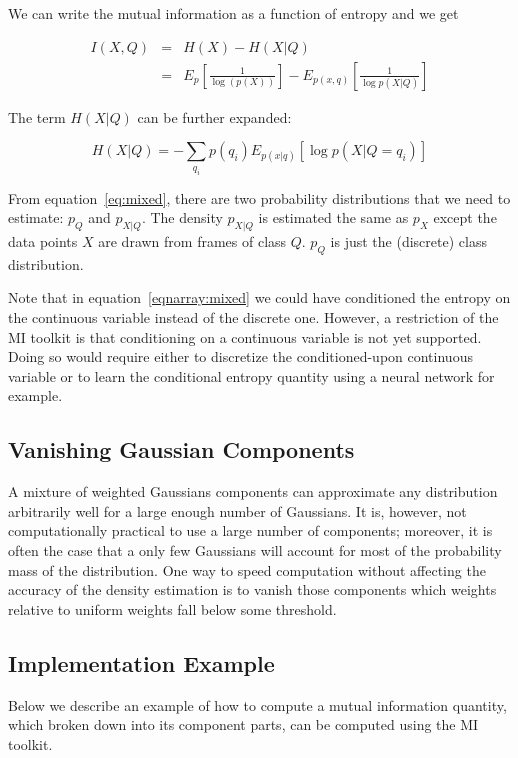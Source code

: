 \documentclass{article}
\begin{document}
We can write the mutual information as a function of entropy and we get

\begin{eqnarray}
\label{eqnarray:mixed}
I(X,Q) 	&=& H(X) - H(X|Q) \\
	&=& E_p[\frac{1}{\log(p(X))}] - E_{p(x,q)}[\frac{1}{\log p(X|Q)}]
\end{eqnarray}

The term $H(X|Q)$ can be further expanded:

\begin{equation}
\label{eq:mixed}
H(X|Q)=-\sum_{q_i} p(q_i) E_{p(x|q)}[\log p(X|Q=q_i)]
\end{equation}

From equation~\ref{eq:mixed}, there are two probability distributions
that we need to estimate:  $p_Q$ and $p_{X|Q}$.  The density
$p_{X|Q}$ is estimated the same as $p_X$ except the data points $X$
are drawn from frames of class $Q$.  $p_Q$ is just the (discrete)
class distribution. 

Note that in equation~\ref{eqnarray:mixed} we could have conditioned the
entropy on the continuous variable instead of the discrete one.  However,
a restriction of the MI toolkit is that conditioning on a continuous
variable is not yet supported.  Doing so would require either
to discretize the conditioned-upon continuous variable or to learn the
conditional entropy quantity using a neural network for example.

\subsection{Vanishing Gaussian Components}

A mixture of weighted Gaussians components can approximate any
distribution arbitrarily well for a large enough number of Gaussians.
It is, however, not computationally practical to use a large number of
components; moreover, it is often the case that a only few Gaussians
will account for most of the probability mass of the distribution.
One way to speed computation without affecting the accuracy of the
density estimation is to vanish those components which weights
relative to uniform weights fall below some threshold.

\subsection{Implementation Example}

Below we describe an example of how to compute a mutual information
quantity, which broken down into its component parts, can be computed
using the MI toolkit.
\end{document}
